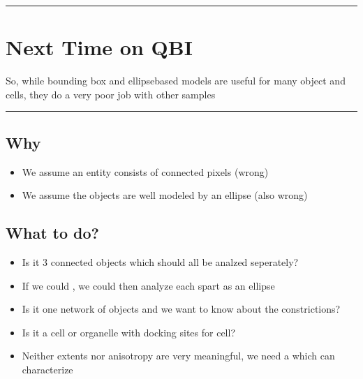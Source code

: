 \documentclass[letterpaper,10pt,english]{sphinxmanual}
\begin{document}
\bigskip\hrule\bigskip



\chapter{Next Time on QBI}
\label{\detokenize{06-ShapeAnalysis:next-time-on-qbi}}
\sphinxAtStartPar
So, while bounding box and ellipse\sphinxhyphen{}based models are useful for many object and cells, they do a very poor job with other samples


\bigskip\hrule\bigskip



\section{Why}
\label{\detokenize{06-ShapeAnalysis:why}}\begin{itemize}
\item {} 
\sphinxAtStartPar
We assume an entity consists of connected pixels (wrong)

\item {} 
\sphinxAtStartPar
We assume the objects are well modeled by an ellipse (also wrong)

\end{itemize}


\section{What to do?}
\label{\detokenize{06-ShapeAnalysis:what-to-do}}\begin{itemize}
\item {} 
\sphinxAtStartPar
Is it 3 connected objects which should all be analzed seperately?

\item {} 
\sphinxAtStartPar
If we could , we could then analyze each spart as an ellipse

\item {} 
\sphinxAtStartPar
Is it one network of objects and we want to know about the constrictions?

\item {} 
\sphinxAtStartPar
Is it a cell or organelle with docking sites for cell?

\item {} 
\sphinxAtStartPar
Neither extents nor anisotropy are very meaningful, we need a  which can characterize

\end{itemize}
\end{document}
